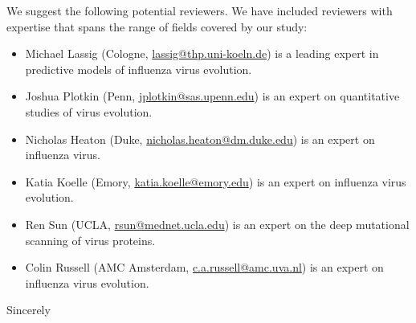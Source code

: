 \documentclass[a4paper,11pt]{letter}
\begin{document}
\begin{letter}{}
We suggest the following potential reviewers.
We have included reviewers with expertise that spans the range of fields covered by our study:
\begin{itemize}
\item Michael Lassig (Cologne, \href{mailto:lassig@thp.uni-koeln.de}{lassig@thp.uni-koeln.de}) is a leading expert in predictive models of influenza virus evolution.
\item Joshua Plotkin (Penn, \href{mailto:jplotkin@sas.upenn.edu}{jplotkin@sas.upenn.edu}) is an expert on quantitative studies of virus evolution.
\item Nicholas Heaton (Duke, \href{mailto:nicholas.heaton@dm.duke.edu}{nicholas.heaton@dm.duke.edu}) is an expert on influenza virus.
\item Katia Koelle (Emory, \href{mailto:katia.koelle@emory.edu}{katia.koelle@emory.edu}) is an expert on influenza virus evolution.
\item Ren Sun (UCLA, \href{mailto:rsun@mednet.ucla.edu}{rsun@mednet.ucla.edu}) is an expert on the deep mutational scanning of virus proteins.
\item Colin Russell (AMC Amsterdam, \href{mailto:c.a.russell@amc.uva.nl}{c.a.russell@amc.uva.nl}) is an expert on influenza virus evolution.
\end{itemize}

\closing{Sincerely} %

\end{letter}
\end{document}
